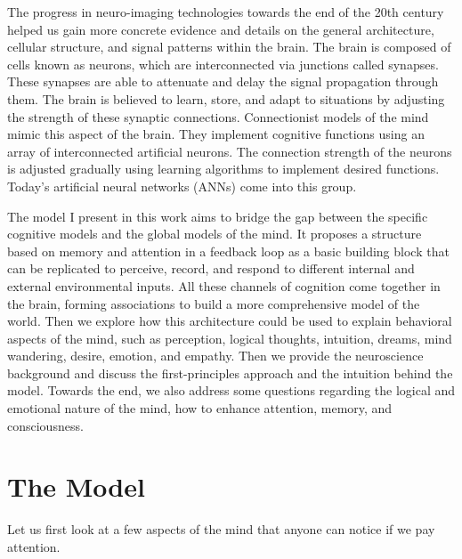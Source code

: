 \documentclass[reprint,amsmath,amssymb,apr,aip,onecolumn, 11pt]{revtex4-1}
\begin{document}
	
	The progress in neuro-imaging technologies towards the end of the 20th century helped us gain more concrete evidence and details on the general architecture, cellular structure, and signal patterns within the brain. The brain is composed of cells known as neurons, which are interconnected via junctions called synapses. These synapses are able to attenuate and delay the signal propagation through them. The brain is believed to learn, store, and adapt to situations by adjusting the strength of these synaptic connections. Connectionist models of the mind mimic this aspect of the brain. They implement cognitive functions using an array of interconnected artificial neurons. The connection strength of the neurons is adjusted gradually using learning algorithms to implement desired functions. Today's artificial neural networks (ANNs) come into this group. 
	
	The model I present in this work aims to bridge the gap between the specific cognitive models and the global models of the mind. It proposes a structure based on memory and attention in a feedback loop as a basic building block that can be replicated to perceive, record, and respond to different internal and external environmental inputs. All these channels of cognition come together in the brain, forming associations to build a more comprehensive model of the world. Then we explore how this architecture could be used to explain behavioral aspects of the mind, such as perception, logical thoughts, intuition, dreams, mind wandering, desire, emotion, and empathy.  Then we provide the neuroscience background and discuss the first-principles approach and the intuition behind the model. Towards the end, we also address some questions regarding the logical and emotional nature of the mind, how to enhance attention, memory, and consciousness. 
	
	

	
	
	
	\section{The Model }
	Let us first look at a few aspects of the mind that anyone can notice if we pay attention. 
	
\end{document}
